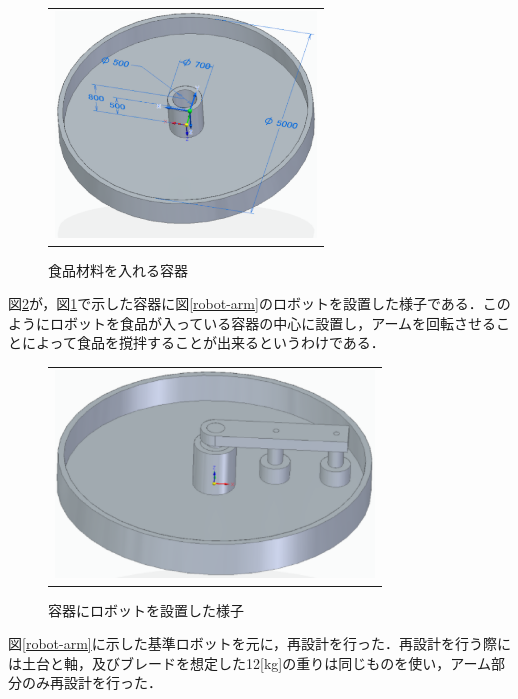 \begin{figure}[htbp]
  \begin{center}
    \begin{tabular}{c}
      \includegraphics[height=6.0cm]{img/eps/container-model.eps}
    \end{tabular}
    \caption{食品材料を入れる容器}
    \label{container-model}
  \end{center}
\end{figure}

図\ref{container-with-robot}が，図\ref{container-model}で示した容器に図\ref{robot-arm}のロボットを設置した様子である．このようにロボットを食品が入っている容器の中心に設置し，アームを回転させることによって食品を撹拌することが出来るというわけである．

\begin{figure}[htbp]
  \begin{center}
    \begin{tabular}{c}
      \includegraphics[height=5.5cm]{img/eps/default.eps}
    \end{tabular}
    \caption{容器にロボットを設置した様子}
    \label{container-with-robot}
  \end{center}
\end{figure}

図\ref{robot-arm}に示した基準ロボットを元に，再設計を行った．再設計を行う際には土台と軸，及びブレードを想定した12{[}kg{]}の重りは同じものを使い，アーム部分のみ再設計を行った．

